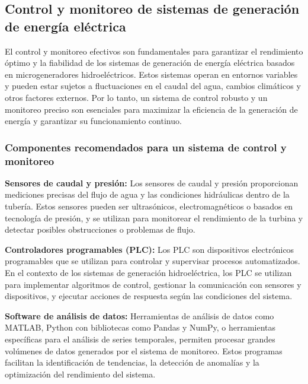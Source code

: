 \documentclass[11pt]{article}
\begin{document}
            \subsection{Control y monitoreo de sistemas de generación de energía eléctrica}
            El control y monitoreo efectivos son fundamentales para garantizar el rendimiento óptimo y
            la fiabilidad de los sistemas de generación de energía eléctrica basados en
            microgeneradores hidroeléctricos. Estos sistemas operan en entornos variables y pueden
            estar sujetos a fluctuaciones en el caudal del agua, cambios climáticos y otros factores
            externos. Por lo tanto, un sistema de control robusto y un monitoreo preciso son esenciales
            para maximizar la eficiencia de la generación de energía y garantizar su funcionamiento
            continuo.

            \subsubsection{Componentes recomendados para un sistema de control y monitoreo}

            \textbf{Sensores de caudal y presión:} Los sensores de caudal y presión proporcionan mediciones
            precisas del flujo de agua y las condiciones hidráulicas dentro de la tubería. Estos sensores
            pueden ser ultrasónicos, electromagnéticos o basados en tecnología de presión, y se
            utilizan para monitorear el rendimiento de la turbina y detectar posibles obstrucciones o
            problemas de flujo.

            \textbf{Controladores programables (PLC):} Los PLC son dispositivos electrónicos programables
            que se utilizan para controlar y supervisar procesos automatizados. En el contexto de los
            sistemas de generación hidroeléctrica, los PLC se utilizan para implementar algoritmos de
            control, gestionar la comunicación con sensores y dispositivos, y ejecutar acciones de
            respuesta según las condiciones del sistema.

            \textbf{Software de análisis de datos:} Herramientas de análisis de datos como MATLAB, Python
            con bibliotecas como Pandas y NumPy, o herramientas específicas para el análisis de
            series temporales, permiten procesar grandes volúmenes de datos generados por el
            sistema de monitoreo. Estos programas facilitan la identificación de tendencias, la detección
            de anomalías y la optimización del rendimiento del sistema.
\end{document}
